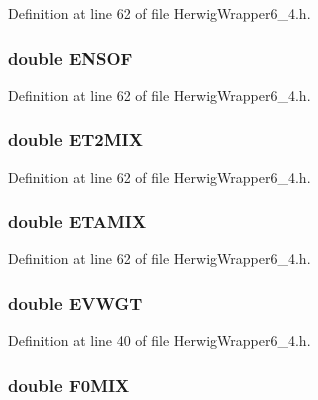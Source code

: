 Definition at line 62 of file Herwig\-Wrapper6\_\-4.h.
\subsubsection{\setlength{\rightskip}{0pt plus 5cm}double {\bf ENSOF}}\label{HerwigWrapper6__4_8h_8c2339100e28483b2b51e8ef5bf58b46}




Definition at line 62 of file Herwig\-Wrapper6\_\-4.h.
\subsubsection{\setlength{\rightskip}{0pt plus 5cm}double {\bf ET2MIX}}\label{HerwigWrapper6__4_8h_91a92329859b9058dc4805df860f99e6}




Definition at line 62 of file Herwig\-Wrapper6\_\-4.h.
\subsubsection{\setlength{\rightskip}{0pt plus 5cm}double {\bf ETAMIX}}\label{HerwigWrapper6__4_8h_c5183bf78e2070274867d2f588abe94e}




Definition at line 62 of file Herwig\-Wrapper6\_\-4.h.
\subsubsection{\setlength{\rightskip}{0pt plus 5cm}double {\bf EVWGT}}\label{HerwigWrapper6__4_8h_bce8bf7b0ace23488f18384117a900a1}




Definition at line 40 of file Herwig\-Wrapper6\_\-4.h.
\subsubsection{\setlength{\rightskip}{0pt plus 5cm}double {\bf F0MIX}}\label{HerwigWrapper6__4_8h_6432c375bf3d9468653810bcea26ae07}




